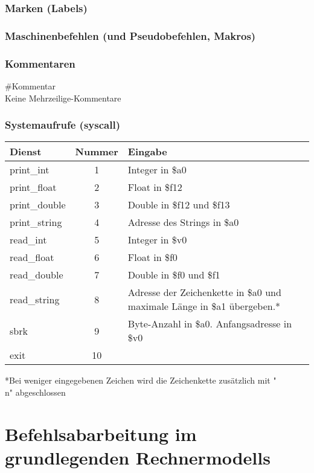 \documentclass[a4paper]{scrartcl}
\begin{document}
			
			\subsubsection{Marken (Labels)} 
			
			\subsubsection{Maschinenbefehlen (und Pseudobefehlen, Makros)} 
			
			\subsubsection{Kommentaren}
			\#Kommentar\\
			Keine Mehrzeilige-Kommentare\\
			
			\subsubsection{Systemaufrufe (syscall)}
			\begin{table}[H]
				\begin{tabular}{|l|c|l|}
					\hline
					Dienst & Nummer & Eingabe \\
					\hline
					print\_int & 1 & Integer in \$a0\\
					print\_float & 2 & Float in \$f12\\
					print\_double & 3 & Double in \$f12 und \$f13\\
					print\_string & 4 &Adresse des Strings in \$a0 \\
					read\_int & 5 & Integer in \$v0\\
					read\_float & 6 & Float in \$f0\\
					read\_double & 7 & Double in \$f0 und \$f1\\
					read\_string & 8 &Adresse der Zeichenkette in \$a0 und  maximale Länge in \$a1 übergeben.* \\
					sbrk & 9 &	Byte-Anzahl in \$a0.  Anfangsadresse in \$v0\\
					exit & 10&\\
					\hline
				\end{tabular}
			\end{table}
			*Bei weniger eingegebenen Zeichen wird die Zeichenkette zusätzlich mit "\\n" abgeschlossen \\
		
		
	\section{Befehlsabarbeitung im grundlegenden Rechnermodells}
\end{document}

